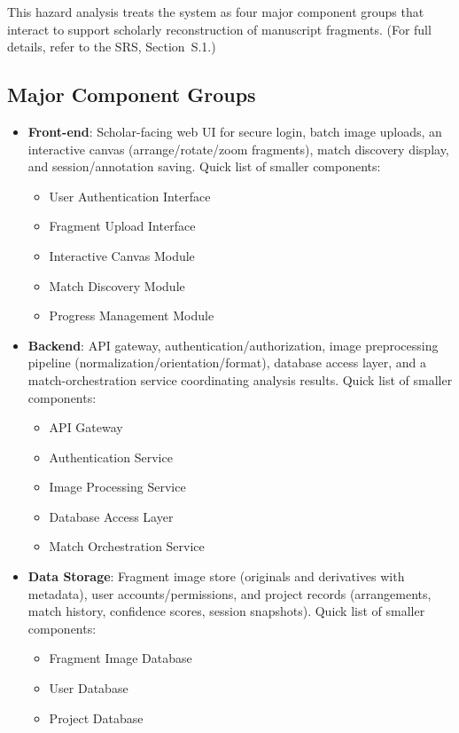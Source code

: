 \documentclass{article}
\begin{document}
This hazard analysis treats the system as four major component groups that interact to support scholarly reconstruction of manuscript fragments. (For full details, refer to the SRS, Section~S.1.)

\subsection*{Major Component Groups}
\begin{itemize}
  \item \textbf{Front-end}: Scholar-facing web UI for secure login, batch image uploads, an interactive canvas (arrange/rotate/zoom fragments), match discovery display, and session/annotation saving. Quick list of smaller components:
  \begin{itemize} 
    \item User Authentication Interface
    \item Fragment Upload Interface
    \item Interactive Canvas Module
    \item Match Discovery Module
    \item Progress Management Module
  \end{itemize}
  \item \textbf{Backend}: API gateway, authentication/authorization, image preprocessing pipeline (normalization/orientation/format), database access layer, and a match-orchestration service coordinating analysis results. Quick list of smaller components:
   \begin{itemize} 
    \item API Gateway
    \item Authentication Service
    \item Image Processing Service
    \item Database Access Layer
    \item Match Orchestration Service
   \end{itemize}
  \item \textbf{Data Storage}: Fragment image store (originals and derivatives with metadata), user accounts/permissions, and project records (arrangements, match history, confidence scores, session snapshots). Quick list of smaller components:
  \begin{itemize} 
    \item Fragment Image Database
    \item User Database
    \item Project Database
   \end{itemize}

\end{itemize}
\end{document}
